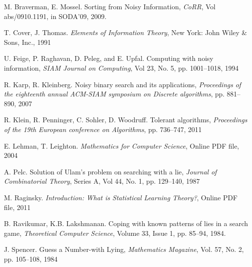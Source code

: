 \documentclass[12pt]{article}
\begin{document}
\begin{thebibliography}{9}

	M. Braverman, E. Mossel. Sorting from Noisy Information, \emph{CoRR}, Vol abs/0910.1191, in SODA'09, 2009.

	T. Cover, J. Thomas. \emph{Elements of Information Theory}, New York: John Wiley \& Sons, Inc., 1991
 
	U. Feige, P. Raghavan, D. Peleg, and E. Upfal. Computing with noisy information, \emph{SIAM Journal on Computing}, Vol 23, No. 5, pp. 1001--1018, 1994

	R. Karp, R. Kleinberg. Noisy binary search and its applications, \emph{Proceedings of the eighteenth annual ACM-SIAM symposium on Discrete algorithms}, pp. 881--890, 2007
	
	R. Klein, R. Penninger, C. Sohler, D. Woodruff. Tolerant algorithms, \emph{Proceedings of the 19th European conference on Algorithms}, pp. 736--747, 2011
	
	E. Lehman, T. Leighton. \emph{Mathematics for Computer Science}, Online PDF file, 2004
	
	A. Pelc. Solution of Ulam's problem on searching with a lie, \emph{Journal of Combinatorial Theory}, Series A, Vol 44, No. 1, pp. 129--140, 1987

	M. Raginsky. \emph{Introduction: What is Statistical Learning Theory?}, 
	 Online PDF file, 2011
	 
	B. Ravikumar, K.B. Lakshmanan. Coping with known patterns of lies in a search game, \emph{Theoretical Computer Science}, Volume 33, Issue 1, pp. 85--94, 1984.
	
	J. Spencer. Guess a Number-with Lying, \emph{Mathematics Magazine}, Vol. 57, No. 2, pp. 105--108, 1984
	  
\end{thebibliography}

\newpage
\appendix
\end{document}
